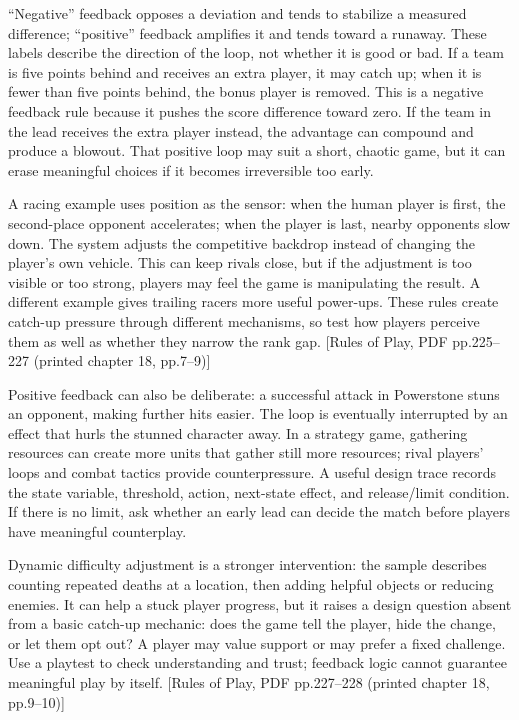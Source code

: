 ``Negative'' feedback opposes a deviation and tends to stabilize a measured difference; ``positive'' feedback amplifies it and tends toward a runaway. These labels describe the direction of the loop, not whether it is good or bad. If a team is five points behind and receives an extra player, it may catch up; when it is fewer than five points behind, the bonus player is removed. This is a negative feedback rule because it pushes the score difference toward zero. If the team in the lead receives the extra player instead, the advantage can compound and produce a blowout. That positive loop may suit a short, chaotic game, but it can erase meaningful choices if it becomes irreversible too early.

A racing example uses position as the sensor: when the human player is first, the second-place opponent accelerates; when the player is last, nearby opponents slow down. The system adjusts the competitive backdrop instead of changing the player's own vehicle. This can keep rivals close, but if the adjustment is too visible or too strong, players may feel the game is manipulating the result. A different example gives trailing racers more useful power-ups. These rules create catch-up pressure through different mechanisms, so test how players perceive them as well as whether they narrow the rank gap. {[}Rules of Play, PDF pp.225--227 (printed chapter 18, pp.7--9){]}

Positive feedback can also be deliberate: a successful attack in Powerstone stuns an opponent, making further hits easier. The loop is eventually interrupted by an effect that hurls the stunned character away. In a strategy game, gathering resources can create more units that gather still more resources; rival players' loops and combat tactics provide counterpressure. A useful design trace records the state variable, threshold, action, next-state effect, and release/limit condition. If there is no limit, ask whether an early lead can decide the match before players have meaningful counterplay.

Dynamic difficulty adjustment is a stronger intervention: the sample describes counting repeated deaths at a location, then adding helpful objects or reducing enemies. It can help a stuck player progress, but it raises a design question absent from a basic catch-up mechanic: does the game tell the player, hide the change, or let them opt out? A player may value support or may prefer a fixed challenge. Use a playtest to check understanding and trust; feedback logic cannot guarantee meaningful play by itself. {[}Rules of Play, PDF pp.227--228 (printed chapter 18, pp.9--10){]}

